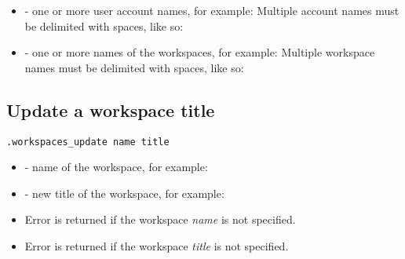 \begin{itemize}

  \item {} - one or more user account names, for example:
         \newline
        Multiple account names must be delimited with spaces, like so:

  \item {} - one or more names of the workspaces, for
        example:
         \newline
        Multiple workspace names must be delimited with spaces, like so: \newline

\end{itemize}

\subsection{Update a workspace title}

\begin{lstlisting}[style=CommandLineStyle]
.workspaces_update name title
\end{lstlisting}

\paramsheader
\begin{itemize}

  \item {} - name of the workspace, for example:

  \item {} - new title of the workspace, for example:

\end{itemize}

\errheader
\begin{itemize}
  \item Error  is returned if the workspace \textit{name} is not specified.
  \item Error  is returned if the workspace \textit{title} is not specified.
\end{itemize}
